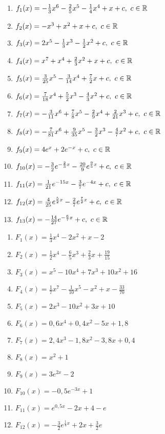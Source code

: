 \begin{Answer}[ref=stammfunktionenA2]
	\begin{enumerate}[label=\alph*)]
		\item \(f_1(x)=-\frac{1}{3}x^6-\frac{2}{5}x^5-\frac{1}{4}x^4+x+c,\ c\in\R\)
		\item \(f_2(x)=-x^3+x^2+x+c,\ c\in\R\)
		\item \(f_3(x)=2x^5-\frac{1}{3}x^3-\frac{1}{2}x^2+c,\ c\in\R\)
		\item \(f_4(x)=x^7+x^4+\frac{2}{3}x^2+x+c,\ c\in\R\)
		\item \(f_5(x)=\frac{3}{25}x^5-\frac{3}{14}x^4+\frac{7}{2}x+c,\ c\in\R\)
		\item \(f_6(x)=\frac{7}{18}x^4+\frac{5}{2}x^3-\frac{4}{3}x^2+c,\ c\in\R\)
		\item \(f_7(x)=-\frac{3}{11}x^6+\frac{7}{8}x^5-\frac{2}{9}x^4+\frac{2}{21}x^3+c,\ c\in\R\)
		\item \(f_8(x)=-\frac{7}{81}x^6+\frac{9}{35}x^5-\frac{3}{2}x^3-\frac{4}{7}x^2+c,\ c\in\R\)
		\item \(f_9(x)=4e^x+2e^{-x}+c,\ c\in\R\)
		\item \(f_{10}(x)=-\frac{3}{2}e^{-\frac{2}{3}x}-\frac{20}{9}e^{\frac{9}{5}x}+c,\ c\in\R\)
		\item \(f_{11}(x)=\frac{1}{21}e^{-15x}-\frac{3}{7}e^{-4x}+c,\ c\in\R\)
		\item \(f_{12}(x)=\frac{4}{25}e^{\frac{5}{2}x}-\frac{2}{7}e^{\frac{7}{2}x}+c,\ c\in\R\)
		\item \(f_{13}(x)=-\frac{14}{27}e^{-\frac{6}{7}x}+c,\ c\in\R\)
	\end{enumerate}
\end{Answer}
\begin{Answer}[ref=stammfunktionenA3]
	\begin{enumerate}[label=\alph*)]
		\item \(F_1(x)=\frac{1}{3}x^4-2x^2+x-2\)
		\item \(F_2(x)=\frac{1}{2}x^4-\frac{6}{5}x^3+\frac{2}{3}x+\frac{19}{15}\)
		\item \(F_3(x)=x^5-10x^4+7x^3+10x^2+16\)
		\item \(F_4(x)=\frac{1}{7}x^7-\frac{1}{10}x^5-x^2+x-\frac{33}{70}\)
		\item \(F_5(x)=2x^3-10x^2+3x+10\)
		\item \(F_6(x)=0,6x^4+0,4x^2-5x+1,8\)
		\item \(F_7(x)=2,4x^3-1,8x^2-3,8x+0,4\)
		\item \(F_8(x)=x^2+1\)
		\item \(F_9(x)=3e^{2x}-2\)%
		\item \(F_{10}(x)=-0,5e^{-3x}+1\)
		\item \(F_{11}(x)=e^{0,5x}-2x+4-e\)
		\item \(F_{12}(x)=-\frac{3}{2}e^{\frac{1}{4}x}+2x+\frac{3}{2}e\)
	\end{enumerate}
\end{Answer}
